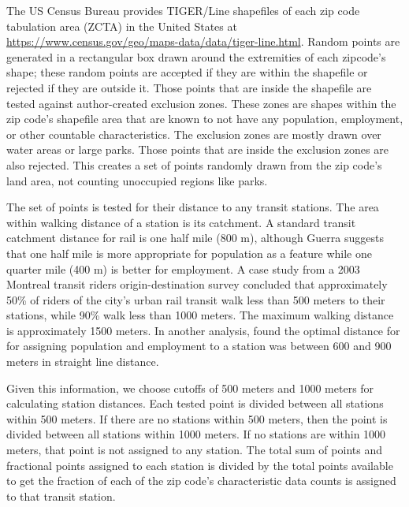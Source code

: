 \documentclass[11pt]{article}
\begin{document}
The US Census Bureau provides TIGER/Line shapefiles of each zip code tabulation area (ZCTA) in the United States at \url{https://www.census.gov/geo/maps-data/data/tiger-line.html}. Random points are generated in a rectangular box drawn around the extremities of each zipcode's shape; these random points are accepted if they are within the shapefile or rejected if they are outside it. Those points that are inside the shapefile are tested against author-created exclusion zones. These zones are shapes within the zip code's shapefile area that are known to not have any population, employment, or other countable characteristics. The exclusion zones are mostly drawn over water areas or large parks. Those points that are inside the exclusion zones are also rejected. This creates a set of points randomly drawn from the zip code's land area, not counting unoccupied regions like parks. 

The set of points is tested for their distance to any transit stations. The area within walking distance of a station is its catchment. A standard transit catchment distance for rail is one half mile (800 m), although Guerra \cite{Guerra2012} suggests that one half mile is more appropriate for population as a feature while one quarter mile (400 m) is better for employment. A case study \cite{ElGeneidy2014} from a 2003 Montreal transit riders origin-destination survey concluded that approximately 50\% of riders of the city's urban rail transit walk less than 500 meters to their stations, while 90\% walk less than 1000 meters. The maximum walking distance is approximately 1500 meters. In another analysis, \cite{Gutierrez2011} found the optimal distance for  for assigning population and employment to a station was between 600 and 900 meters in straight line distance.

Given this information, we choose cutoffs of 500 meters and 1000 meters for calculating station distances. Each tested point is divided between all stations within 500 meters. If there are no stations within 500 meters, then the point is divided between all stations within 1000 meters. If no stations are within 1000 meters, that point is not assigned to any station. The total sum of points and fractional points assigned to each station is divided by the total points available to get the fraction of each of the zip code's characteristic data counts is assigned to that transit station. 
\end{document}
